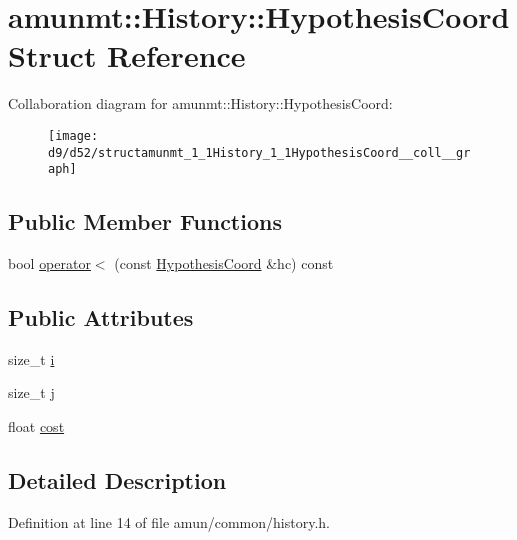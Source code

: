 \hypertarget{structamunmt_1_1History_1_1HypothesisCoord}{}\section{amunmt\+:\+:History\+:\+:Hypothesis\+Coord Struct Reference}
\label{structamunmt_1_1History_1_1HypothesisCoord}


Collaboration diagram for amunmt\+:\+:History\+:\+:Hypothesis\+Coord\+:
\nopagebreak
\begin{figure}[H]
\begin{center}
\leavevmode
\texttt{[image: d9/d52/structamunmt\_1\_1History\_1\_1HypothesisCoord\_\_coll\_\_graph]}
\end{center}
\end{figure}
\subsection*{Public Member Functions}
\begin{DoxyCompactItemize}
\item 
bool \hyperlink{structamunmt_1_1History_1_1HypothesisCoord_a7b812c07f56397096277c3258f609d88}{operator$<$} (const \hyperlink{structamunmt_1_1History_1_1HypothesisCoord}{Hypothesis\+Coord} \&hc) const 
\end{DoxyCompactItemize}
\subsection*{Public Attributes}
\begin{DoxyCompactItemize}
\item 
size\+\_\+t \hyperlink{structamunmt_1_1History_1_1HypothesisCoord_ad8a53a619db520aa979d7af8cd77a744}{i}
\item 
size\+\_\+t \hyperlink{structamunmt_1_1History_1_1HypothesisCoord_a0c21abf89842a2cbc9d52b47e587c8be}{j}
\item 
float \hyperlink{structamunmt_1_1History_1_1HypothesisCoord_a5ae4bffb234c76f806fff02cd1a6a8eb}{cost}
\end{DoxyCompactItemize}


\subsection{Detailed Description}


Definition at line 14 of file amun/common/history.\+h.



